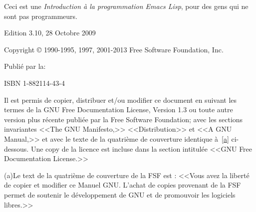 Ceci est une \emph{Introduction à la programmation Emacs Lisp}, pour
des gens qui ne sont pas programmeurs.\par

Edition 3.10, 28 Octobre 2009

Copyright \copyright{} 1990-1995, 1997, 2001-2013 Free Software Foundation,
Inc.

Publié par la:

 

 

 

 

ISBN 1-882114-43-4

Il est permis de copier, distribuer et/ou modifier ce document en
suivant les termes de la GNU Free Documentation License, Version 1.3
ou toute autre version plus récente publiée par la Free Software
Foundation; avec les sections invariantes <<The GNU Manifesto,>>
<<Distribution>> et <<A GNU Manual,>> et avec le texte de la quatrième de
couverture identique à~\ref{a} ci-dessous. Une copy de la licence est
incluse dans la section intitulée <<GNU Free Documentation License.>>

\label{a}(a)Le text de la quatrième de couverture de la FSF est
: <<Vous avez la liberté de copier et modifier ce Manuel GNU. L'achat
de copies provenant de la FSF permet de soutenir le développement de
GNU et de promouvoir les logiciels libres.>>
